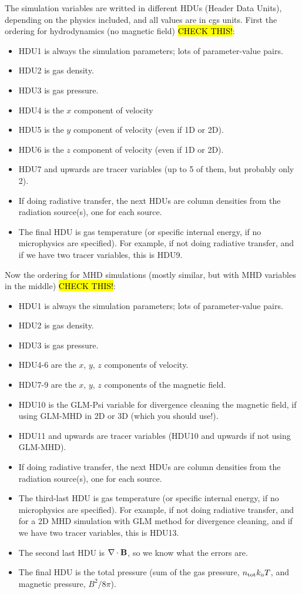 \documentclass[a4paper,11pt]{report}
\begin{document}
The simulation variables are writted in different HDUs (Header Data Units), depending on the physics included, and all values are in cgs units.
First the ordering for hydrodynamics (no magnetic field) \hl{CHECK THIS!}:
\begin{itemize}
\item HDU1 is always the simulation parameters; lots of parameter-value pairs.
\item HDU2 is gas density.
\item HDU3 is gas pressure.
\item HDU4 is the $x$ component of velocity
\item HDU5 is the $y$ component of velocity (even if 1D or 2D).
\item HDU6 is the $z$ component of velocity (even if 1D or 2D).
\item HDU7 and upwards are tracer variables (up to 5 of them, but probably only 2).
\item If doing radiative transfer, the next HDUs are column densities from the radiation source(s), one for each source.
\item The final HDU is gas temperature (or specific internal energy, if no microphysics are specified).
  For example, if not doing radiative transfer, and if we have two tracer variables, this is HDU9.
\end{itemize}

Now the ordering for MHD simulations (mostly similar, but with MHD variables in the middle) \hl{CHECK THIS!}:
\begin{itemize}
\item HDU1 is always the simulation parameters; lots of parameter-value pairs.
\item HDU2 is gas density.
\item HDU3 is gas pressure.
\item HDU4-6 are the $x$, $y$, $z$ components of velocity.
\item HDU7-9 are the $x$, $y$, $z$ components of the magnetic field. 
\item HDU10 is the GLM-Psi variable for divergence cleaning the magnetic field, if using GLM-MHD in 2D or 3D (which you should use!).
\item HDU11 and upwards are tracer variables (HDU10 and upwards if not using GLM-MHD).
\item If doing radiative transfer, the next HDUs are column densities from the radiation source(s), one for each source.
\item The third-last HDU is gas temperature (or specific internal energy, if no microphysics are specified).
  For example, if not doing radiative transfer, and for a 2D MHD simulation with GLM method for divergence cleaning, and if we have two tracer variables, this is HDU13.
\item The second last HDU is $\mathbf{\nabla}\cdot\mathbf{B}$, so we know what the errors are.
\item The final HDU is the total pressure (sum of the gas pressure, $n_{\mathrm{tot}}k_{\mathrm{\textsc{b}}}T$, and magnetic pressure, $B^2/8\pi$).
\end{itemize}
\end{document}
